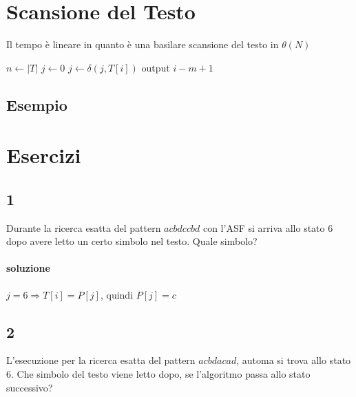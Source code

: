 \section{Scansione del Testo}

Il tempo \`e lineare in quanto \`e una basilare scansione del testo in $\theta(N)$

\begin{algorithm}
    \begin{algorithmic}
            \State $n \gets |T|$
            \State $j \gets 0$
              \State $j \gets \delta(j, T[i])$
                \State output $i-m+1$
              \EndIf
            \EndFor
        \EndProcedure
    \end{algorithmic}
\end{algorithm}

\subsection{Esempio}


\section{Esercizi}

\subsection{1}

Durante la ricerca esatta del pattern $acbdccbd$ con l'ASF si arriva allo stato $6$ dopo avere letto un certo simbolo nel testo. Quale simbolo?

\paragraph{soluzione} $j = 6 \Rightarrow T[i] = P[j]$, quindi $P[j] = c$

\subsection{2}

L’esecuzione per la ricerca esatta del pattern $acbdacad$, automa si trova allo stato 6. Che simbolo del testo viene letto dopo, se l’algoritmo passa allo stato successivo?

